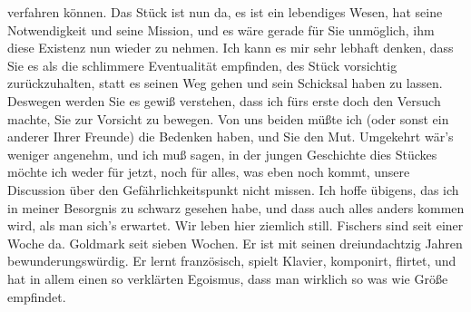 \begin{ledgroupsized}[t]{13cm}
               verfahren können. Das Stück
               ist nun da, es ist ein lebendiges Wesen, hat seine Notwendigkeit und seine Mission,
               und es wäre gerade für Sie unmöglich, ihm diese Existenz nun wieder zu nehmen. Ich
               kann es mir sehr lebhaft denken, dass Sie es als die schlimmere Eventualität
               empfinden, des Stück
               vorsichtig zurückzuhalten, statt es seinen Weg gehen und sein Schicksal haben zu
               lassen. Deswegen werden Sie es gewiß verstehen, dass ich fürs erste doch den Versuch
               machte, Sie zur Vorsicht zu bewegen. Von uns beiden müßte ich (oder sonst ein anderer
               Ihrer Freunde) die Bedenken haben, und Sie den Mut. Umgekehrt wär’s weniger angenehm,
               und ich muß sagen, in der jungen Geschichte dies Stückes möchte ich weder für jetzt, noch für alles, was
               eben noch kommt, unsere Discussion über den Gefährlichkeitspunkt nicht missen. Ich
               hoffe übigens, das ich in meiner Besorgnis zu schwarz gesehen habe, und dass auch
               alles anders kommen wird, als man sich's erwartet. \pend
           \pstart
           Wir leben hier ziemlich still. Fischers sind seit einer Woche da. Goldmark seit sieben Wochen. Er ist mit seinen dreiundachtzig Jahren
               bewunderungswürdig. Er lernt französisch, spielt Klavier, komponirt, flirtet, und hat
               in allem einen so verklärten Egoismus, dass man wirklich so was wie Größe empfindet.

\end{ledgroupsized}
